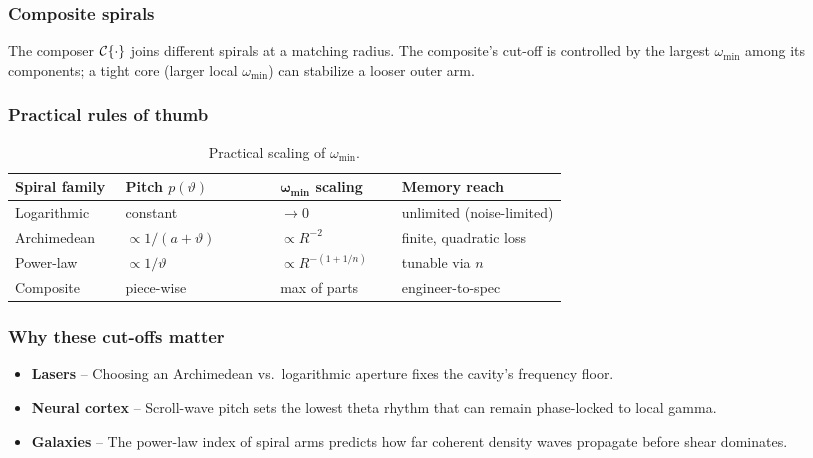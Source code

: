 \subsubsection*{Composite spirals}

The composer \(\mathcal{C}\{\cdot\}\) joins different spirals at a matching radius. The composite’s cut-off is controlled by the largest \(\omega_{\min}\) among its components; a tight core (larger local \(\omega_{\min}\)) can stabilize a looser outer arm.

\subsubsection*{Practical rules of thumb}

\begin{table}[H]
  \small
  \centering
  \caption{Practical scaling of \(\omega_{\min}\).}
  \label{tab:spiral-thumb}
  \renewcommand{\arraystretch}{1.15}
  \begin{tabularx}{\linewidth}{@{}p{0.20\linewidth} p{0.28\linewidth} p{0.22\linewidth} X@{}}
    \toprule
    \textbf{Spiral family}
      & \textbf{Pitch \(p(\vartheta)\)}
      & \(\boldsymbol{\omega_{\min}}\) \textbf{scaling}
      & \textbf{Memory reach} \\
    \midrule
    Logarithmic   & constant                    & \(\to0\)                   & unlimited (noise-limited) \\
    Archimedean   & \(\propto 1/(a+\vartheta)\) & \(\propto R^{-2}\)         & finite, quadratic loss \\
    Power-law     & \(\propto 1/\vartheta\)     & \(\propto R^{-(1+1/n)}\)   & tunable via \(n\) \\
    Composite     & piece-wise                  & max of parts               & engineer-to-spec \\
    \bottomrule
  \end{tabularx}
\end{table}

\subsubsection*{Why these cut-offs matter}

\begin{itemize}[leftmargin=1.5em]
  \item \textbf{Lasers} – Choosing an Archimedean vs.\ logarithmic aperture fixes the cavity’s frequency floor.
  \item \textbf{Neural cortex} – Scroll-wave pitch sets the lowest theta rhythm that can remain phase-locked to local gamma.
  \item \textbf{Galaxies} – The power-law index of spiral arms predicts how far coherent density waves propagate before shear dominates.
\end{itemize}

